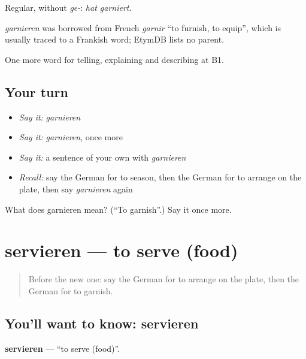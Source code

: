 Regular, without \emph{ge-}: \emph{hat garniert}.

\begin{cousinweb}
\emph{garnieren} was borrowed from French \emph{garnir} \textquotedblleft{}to furnish, to equip\textquotedblright{}, which is usually traced to a Frankish word; EtymDB lists no parent.
\end{cousinweb}

\begin{grammarlens}[title={What you've built}]
One more word for telling, explaining and describing at B1.
\end{grammarlens}

\subsection*{Your turn}
\begin{itemize}
\raggedright
  \item \emph{Say it:} \emph{garnieren}
  \item \emph{Say it:} \emph{garnieren}, once more
  \item \emph{Say it:} a sentence of your own with \emph{garnieren}
  \item \emph{Recall:} say the German for to season, then the German for to arrange on the plate, then say \emph{garnieren} again
\end{itemize}

\begin{tcolorbox}[breakable,colback=teal!4,colframe=teal!35!black,title={Before you move on}]
What does garnieren mean? (\textquotedblleft{}To garnish\textquotedblright{}.) Say it once more.
\end{tcolorbox}
\section[servieren]{servieren — to serve (food)}

\label{lesson:GE-C329-servieren}



\begin{quote}
Before the new one: say the German for to arrange on the plate, then the German for to garnish.
\end{quote}

\subsection*{You'll want to know: servieren}
\textbf{servieren} — \textquotedblleft{}to serve (food)\textquotedblright{}.


